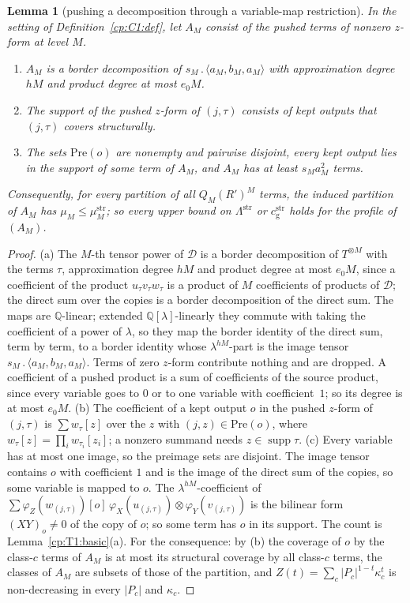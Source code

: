 \documentclass[11pt]{article}
\newtheorem{lemma}[theorem]{Lemma}
\theoremstyle{definition}
\theoremstyle{remark}
\providecommand{\Q}{\mathbb{Q}}
\newcommand{\abs}[1]{\lvert #1\rvert}
\DeclareMathOperator{\supp}{supp}
\newcommand{\mat}[3]{\langle #1,#2,#3\rangle} %
\newcommand{\cp}{\mathbin{.}}                 %
\newcommand{\Lam}{\Lambda}                    %
\newcommand{\cg}{c_{\mathrm g}}               %
\newcommand{\Pre}{\mathrm{Pre}}              %
\begin{document}
\begin{lemma}[pushing a decomposition through a variable-map restriction]\label{cp:C1}
In the setting of Definition~\ref{cp:C1:def}, let $A_M$ consist of the pushed terms of nonzero $z$-form at level $M$.
\begin{enumerate}[label=(\alph*)]
\item $A_M$ is a border decomposition of $s_M\cp\mat{a_M}{b_M}{a_M}$ with approximation degree $hM$ and product degree at most $e_0M$.
\item The support of the pushed $z$-form of $(j,\tau)$ consists of kept outputs that $(j,\tau)$ covers structurally.
\item The sets $\Pre(o)$ are nonempty and pairwise disjoint, every kept output lies in the support of some term of $A_M$, and $A_M$ has at least $s_Ma_M^2$ terms.
\end{enumerate}
Consequently, for every partition of all $Q_M(R')^M$ terms, the induced partition of $A_M$ has $\mu_M\le\mu^{\mathrm{str}}_M$; so every upper bound on $\Lam^{\mathrm{str}}$ or $\cg^{\mathrm{str}}$ holds for the profile of $(A_M)$.
\end{lemma}

\begin{proof}
(a) The $M$-th tensor power of $\mathcal D$ is a border decomposition of $T^{\otimes M}$ with the terms $\tau$, approximation degree $hM$ and product degree at most $e_0M$, since a coefficient of the product $u_\tau v_\tau w_\tau$ is a product of $M$ coefficients of products of $\mathcal D$; the direct sum over the copies is a border decomposition of the direct sum. The maps are $\Q$-linear; extended $\Q[\lambda]$-linearly they commute with taking the coefficient of a power of $\lambda$, so they map the border identity of the direct sum, term by term, to a border identity whose $\lambda^{hM}$-part is the image tensor $s_M\cp\mat{a_M}{b_M}{a_M}$. Terms of zero $z$-form contribute nothing and are dropped. A coefficient of a pushed product is a sum of coefficients of the source product, since every variable goes to $0$ or to one variable with coefficient~$1$; so its degree is at most $e_0M$.
(b) The coefficient of a kept output $o$ in the pushed $z$-form of $(j,\tau)$ is $\sum w_\tau[z]$ over the $z$ with $(j,z)\in\Pre(o)$, where $w_\tau[z]=\prod_iw_{\tau_i}[z_i]$; a nonzero summand needs $z\in\supp\tau$.
(c) Every variable has at most one image, so the preimage sets are disjoint. The image tensor contains $o$ with coefficient $1$ and is the image of the direct sum of the copies, so some variable is mapped to $o$. The $\lambda^{hM}$-coefficient of $\sum\varphi_Z(w_{(j,\tau)})[o]\,\varphi_X(u_{(j,\tau)})\otimes\varphi_Y(v_{(j,\tau)})$ is the bilinear form $(XY)_o\ne0$ of the copy of $o$; so some term has $o$ in its support. The count is Lemma~\ref{cp:T1:basic}(a).
For the consequence: by (b) the coverage of $o$ by the class-$c$ terms of $A_M$ is at most its structural coverage by all class-$c$ terms, the classes of $A_M$ are subsets of those of the partition, and $Z(t)=\sum_c\abs{P_c}^{1-t}\kappa_c^t$ is non-decreasing in every $\abs{P_c}$ and $\kappa_c$.
\end{proof}
\end{document}

